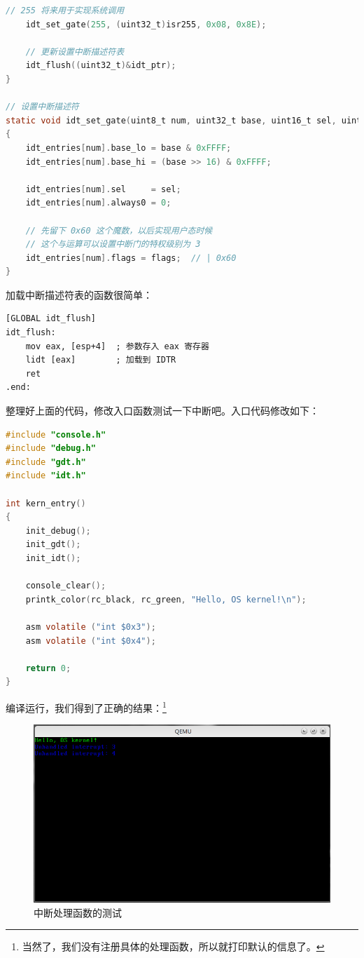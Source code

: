 \begin{lstlisting}[language = C, caption = idt/idt.c]
	// 255 将来用于实现系统调用
	idt_set_gate(255, (uint32_t)isr255, 0x08, 0x8E);

	// 更新设置中断描述符表
	idt_flush((uint32_t)&idt_ptr);
}

// 设置中断描述符
static void idt_set_gate(uint8_t num, uint32_t base, uint16_t sel, uint8_t flags)
{
	idt_entries[num].base_lo = base & 0xFFFF;
	idt_entries[num].base_hi = (base >> 16) & 0xFFFF;

	idt_entries[num].sel     = sel;
	idt_entries[num].always0 = 0;

	// 先留下 0x60 这个魔数，以后实现用户态时候
	// 这个与运算可以设置中断门的特权级别为 3
	idt_entries[num].flags = flags;  // | 0x60
}
\end{lstlisting}

\par 加载中断描述符表的函数很简单：
\begin{lstlisting}[language = {[x86masm]Assembler}, caption = idt/idt\_s.s]
[GLOBAL idt_flush]
idt_flush:
	mov eax, [esp+4]  ; 参数存入 eax 寄存器
	lidt [eax]        ; 加载到 IDTR
	ret
.end:
\end{lstlisting}

\par 整理好上面的代码，修改入口函数测试一下中断吧。入口代码修改如下：
\begin{lstlisting}[language = C, caption = init/entry.c]
#include "console.h"
#include "debug.h"
#include "gdt.h"
#include "idt.h"

int kern_entry()
{
	init_debug();
	init_gdt();
	init_idt();

	console_clear();
	printk_color(rc_black, rc_green, "Hello, OS kernel!\n");

	asm volatile ("int $0x3");
	asm volatile ("int $0x4");

	return 0;
}
\end{lstlisting}

\par 编译运行，我们得到了正确的结果：\footnote{当然了，我们没有注册具体的处理函数，所以就打印默认的信息了。}
\begin{figure}[ht]
      \centering
      \includegraphics[scale=0.5]{picture/chapt7/interrupt_view.png}
      \caption{中断处理函数的测试}
\end{figure}
